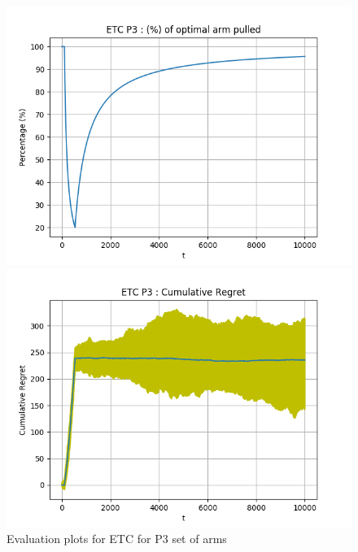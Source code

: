 \documentclass[12pt]{report}
\begin{document}
			\begin{figure}[H]
				\begin{multicols}{2}
					\includegraphics[scale=0.5]{Figures/ETC_P3_109_op.png} \par
					\includegraphics[scale=0.5]{Figures/ETC_P3_109_ret.png}
				\end{multicols}
				\caption{Evaluation plots for ETC for P3 set of arms}
				\label{Fig4}
			\end{figure}
				
\end{document}
